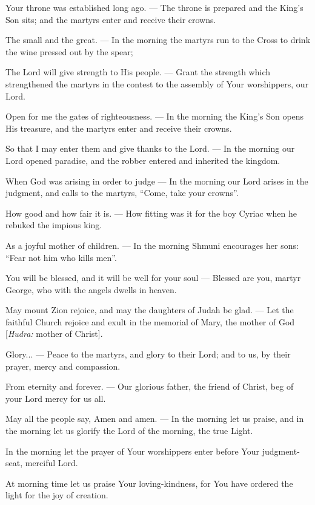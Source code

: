 \documentclass[12pt,twoside,a5paper]{article}
\begin{document}
\begin{halfparskip}
  Your throne was established long ago. --- The throne is prepared and the King's Son sits; and the martyrs enter and receive their crowns.

  The small and the great. --- In the morning the martyrs run to the Cross to drink the wine pressed out by the spear;

  The Lord will give strength to His people. --- Grant the strength which strengthened the martyrs in the contest to the assembly of Your worshippers, our Lord.

  Open for me the gates of righteousness. --- In the morning the King's Son opens His treasure, and the martyrs enter and receive their crowns.

  So that I may enter them and give thanks to the Lord. --- In the morning our Lord opened paradise, and the robber entered and inherited the kingdom.

  When God was arising in order to judge --- In the morning our Lord arises in the judgment, and calls to the martyrs, ``Come, take your crowns''.

  How good and how fair it is. --- How fitting was it for the boy Cyriac when he rebuked the impious king.

  As a joyful mother of children. --- In the morning Shmuni encourages her sons: ``Fear not him who kills men''.

  You will be blessed, and it will be well for your soul --- Blessed are you, martyr George, who with the angels dwells in heaven.

  May mount Zion rejoice, and may the daughters of Judah be glad. --- Let the faithful Church rejoice and exult in the memorial of Mary, the mother of God [\emph{Hudra:} mother of Christ].

  Glory... --- Peace to the martyrs, and glory to their Lord; and to us, by their prayer, mercy and compassion.

  From eternity and forever. --- Our glorious father, the friend of Christ, beg of your Lord mercy for us all.

  May all the people say, Amen and amen. --- In the morning let us praise, and in the morning let us glorify the Lord of the morning, the true Light.

  In the morning let the prayer of Your worshippers enter before Your judgment-seat, merciful Lord.

  At morning time let us praise Your loving-kindness, for You have ordered the light for the joy of creation.
\end{halfparskip}
\end{document}
